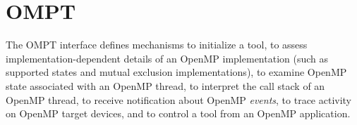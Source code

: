 %
%
%
%
%
%
%
%
%
%
%
%
%


\section{OMPT}
\label{sec:ompt-overview}

The OMPT interface defines mechanisms to initialize a tool, to assess 
implementation-dependent details of an OpenMP implementation (such as 
supported states and mutual exclusion implementations), to examine 
OpenMP state associated with an OpenMP thread, to interpret the call
stack of an OpenMP thread, to receive notification about OpenMP 
\emph{events}, to trace activity on OpenMP target devices, and to
control a tool from an OpenMP application.

